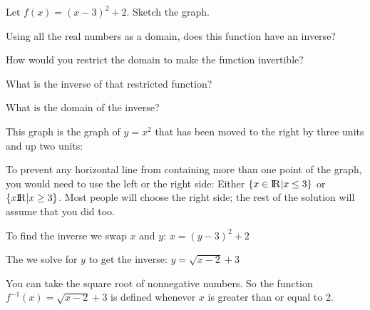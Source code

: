 \begin{Exercise}[title={Find the inverse}, label=simple_inverse]

  Let $f(x) = (x - 3)^2 + 2$.  Sketch the graph.

  Using all the real numbers as a domain, does this function have an inverse?

  How would you restrict the domain to make the function invertible?

  What is the inverse of that restricted function?

  What is the domain of the inverse?

\end{Exercise}
\begin{Answer}[ref=simple_inverse]

  This graph is the graph of $y = x^2$ that has been moved to the right by three units and up two units:
 

To prevent any horizontal line from containing more than one point of
the graph, you would need to use the left or the right side: Either
$\{x \in {\rm I\!R}  | x \leq 3\}$ or $\{x {\rm I\!R}| x \geq 3\}$. Most people will choose the
right side; the rest of the solution will assume that you did too.

To find the inverse we swap $x$ and $y$: $x = (y -3)^2 + 2$

The we solve for $y$ to get the inverse: $y = \sqrt{x - 2} + 3$

You can take the square root of nonnegative numbers. So the function
$f^{-1}(x) = \sqrt{x - 2} + 3$ is defined whenever $x$ is greater than
or equal to 2.

\end{Answer}

